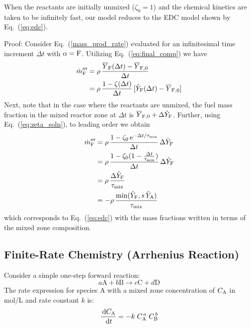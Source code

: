 When the reactants are initially unmixed ($\zeta_0=1$) and the chemical kinetics are taken to be infinitely fast, our model reduces to the EDC model shown by Eq.~(\ref{eq:edc}).

{Proof:} Consider Eq.~(\ref{mass_prod_rate}) evaluated for an infinitesimal time increment $\Delta t$ with $\alpha={\rm F}$.  Utilizing Eq.~(\ref{eq:final_comp}) we have
\begin{align}
\label{eq:edcproof1}
\dot{m}^{\prime\prime\prime}_{\rm F} &= \rho \, \frac{\overline{Y}_{\rm F}(\Delta t) - \overline{Y}_{\rm F,0}}{\Delta t} \notag\\
&=\rho \, \frac{1-\zeta(\Delta t)}{\Delta t} \, [\hat{Y}_{\rm F}(\Delta t) - \overline{Y}_{\rm F,0}] 
\end{align}
Next, note that in the case where the reactants are unmixed, the fuel mass fraction in the mixed reactor zone at $\Delta t$ is $\overline{Y}_{\rm F,0} + \Delta \hat{Y}_{\rm F}$.  Further, using Eq.~(\ref{eq:zeta_soln}), to leading order we obtain
\begin{align}
\dot{m}^{\prime\prime\prime}_{\rm F}
&= \rho \, \frac{1-\zeta_0 \, {\rm e}^{-\Delta t/\tau_{\rm mix}}}{\Delta t} \, \Delta \hat{Y}_{\rm F} \notag \\
&= \rho \, \frac{1-\zeta_0 (1 - \frac{\Delta t}{\tau_{\rm mix}})}{\Delta t} \, \Delta \hat{Y}_{\rm F} \notag \\
&= \rho \, \frac{\Delta \hat{Y}_{\rm F}}{\tau_{\rm mix}} \notag \\
&= - \rho \, \frac{ \min(\hat{Y}_{\rm F}, s \, \hat{Y}_{\rm A}) }{ \tau_{\rm mix} }
\end{align}
which corresponds to Eq.~(\ref{eq:edc}) with the mass fractions written in terms of the mixed zone composition.


\subsection{Finite-Rate Chemistry (Arrhenius Reaction)}
\label{Reaction_Rate_Model}
Consider a simple one-step forward reaction:
\begin{equation}\label{eq:generic_1step}
a\mathrm{A} + b\mathrm{B} \rightarrow c\mathrm{C} + d\mathrm{D}
\end{equation}
The rate expression for species A with a mixed zone concentration of $C_{\mbox{\scriptsize A}}$ in mol/L and rate constant $k$ is:
\begin{equation}\label{eq:generic_rate}
\frac{\,\mathrm{d} C_{\mbox{\scriptsize A}}}{\,\mathrm{d} t}= -k\; C_{\mbox{\scriptsize A}}^{\,a}\; C_{\mbox{\scriptsize B}}^{\,b}
\end{equation}


